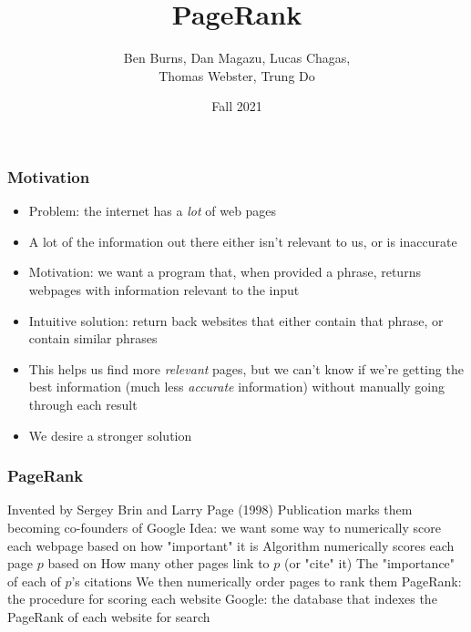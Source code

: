 \documentclass{beamer}
\title{PageRank}
\author{Ben Burns, Dan Magazu, Lucas Chagas, \\Thomas Webster, Trung Do}
\institute{MATH 455}
\date{Fall 2021}
\begin{document}
\frame{\titlepage}
\begin{frame}[t]
\frametitle{Motivation}
\begin{itemize}
    \setlength\itemsep{0.5em}
    \item Problem: the internet has a \emph{lot} of web pages
    \item A lot of the information out there either isn't relevant to us, or is inaccurate
    \item Motivation: we want a program that, when provided a phrase, returns webpages with information relevant to the input
    \item Intuitive solution: return back websites that either contain that phrase, or contain similar phrases
    \item This helps us find more \emph{relevant} pages, but we can't know if we're getting the best information (much less \emph{accurate} information) without manually going through each result
    \item We desire a stronger solution
\end{itemize}
\end{frame}

\begin{frame}[t]
\frametitle{PageRank}
\begin{outline}
    \1 Invented by Sergey Brin and Larry Page (1998)\footnotemark 
        \2 Publication marks them becoming co-founders of Google  
    \1 Idea: we want some way to numerically score each webpage based on how "important" it is
    \1 Algorithm numerically scores each page $p$ based on 
        \2 How many other pages link to $p$ (or "cite" it)
        \2 The "importance" of each of $p$'s citations 
    \1 We then numerically order pages to rank them
    \1 PageRank: the procedure for scoring each website
    \1 Google: the database that indexes the PageRank of each website for search
\end{outline}
\end{frame}
\end{document}
